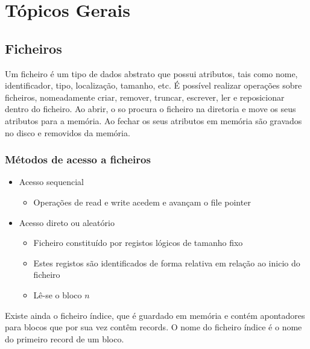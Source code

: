 \documentclass[10pt,a4paper]{report}
\begin{document}
\chapter{Tópicos Gerais}
\section{Ficheiros}
Um ficheiro é um tipo de dados abstrato que possui atributos, tais como nome, identificador, tipo, localização, tamanho, etc. É possível realizar operações sobre ficheiros, nomeadamente criar, remover, truncar, escrever, ler e reposicionar dentro do ficheiro. Ao abrir, o so procura o ficheiro na diretoria e move os seus atributos para a memória. Ao fechar os seus atributos em memória são gravados no disco e removidos da memória.
\subsection{Métodos de acesso a ficheiros}
\begin{itemize}
\item Acesso sequencial
\begin{itemize}
\item Operações de read e write acedem e avançam o file pointer
\end{itemize}
\item Acesso direto ou aleatório
\begin{itemize}
\item Ficheiro constituído por registos lógicos de tamanho fixo
\item Estes registos são identificados de forma relativa em relação ao inicio do ficheiro
\item Lê-se o bloco $n$
\end{itemize}
\end{itemize}
Existe ainda o ficheiro índice, que é guardado em memória e contém apontadores para blocos que por sua vez contêm records. O nome do ficheiro índice é o nome do primeiro record de um bloco.
\end{document}
